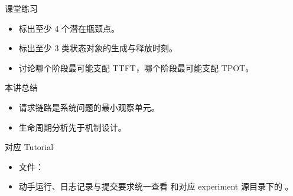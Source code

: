 \begin{frame}{课堂练习}
  \begin{itemize}
    \item 标出至少 4 个潜在瓶颈点。
    \item 标出至少 3 类状态对象的生成与释放时刻。
    \item 讨论哪个阶段最可能支配 TTFT，哪个阶段最可能支配 TPOT。
  \end{itemize}
\end{frame}



\begin{frame}{本讲总结}
  \begin{itemize}
    \item 请求链路是系统问题的最小观察单元。
    \item 生命周期分析先于机制设计。
  \end{itemize}
\end{frame}

\LectureThreeSources

\begin{frame}{对应 Tutorial}
  \begin{itemize}
    \item 文件：\texttt{}
    \item 动手运行、日志记录与提交要求统一查看 \texttt{} 和对应 experiment 源目录下的 \texttt{}。
  \end{itemize}
\end{frame}


